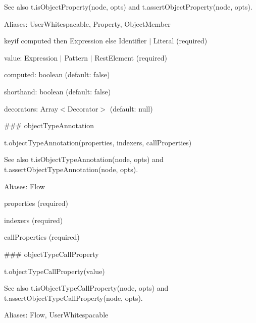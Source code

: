 See also {\ttfamily t.\+is\+Object\+Property(node, opts)} and {\ttfamily t.\+assert\+Object\+Property(node, opts)}.

Aliases\+: {\ttfamily User\+Whitespacable}, {\ttfamily Property}, {\ttfamily Object\+Member}


\begin{DoxyItemize}
\item {\ttfamily key}if computed then {\ttfamily Expression} else {\ttfamily Identifier $\vert$ Literal} (required)
\item {\ttfamily value}\+: {\ttfamily Expression $\vert$ Pattern $\vert$ Rest\+Element} (required)
\item {\ttfamily computed}\+: {\ttfamily boolean} (default\+: {\ttfamily false})
\item {\ttfamily shorthand}\+: {\ttfamily boolean} (default\+: {\ttfamily false})
\item {\ttfamily decorators}\+: {\ttfamily Array$<$Decorator$>$} (default\+: {\ttfamily null}) 


\end{DoxyItemize}

\#\#\# object\+Type\+Annotation 
\begin{DoxyCode}
t.objectTypeAnnotation(properties, indexers, callProperties)
\end{DoxyCode}


See also {\ttfamily t.\+is\+Object\+Type\+Annotation(node, opts)} and {\ttfamily t.\+assert\+Object\+Type\+Annotation(node, opts)}.

Aliases\+: {\ttfamily Flow}


\begin{DoxyItemize}
\item {\ttfamily properties} (required)
\item {\ttfamily indexers} (required)
\item {\ttfamily call\+Properties} (required) 


\end{DoxyItemize}

\#\#\# object\+Type\+Call\+Property 
\begin{DoxyCode}
t.objectTypeCallProperty(value)
\end{DoxyCode}


See also {\ttfamily t.\+is\+Object\+Type\+Call\+Property(node, opts)} and {\ttfamily t.\+assert\+Object\+Type\+Call\+Property(node, opts)}.

Aliases\+: {\ttfamily Flow}, {\ttfamily User\+Whitespacable}


